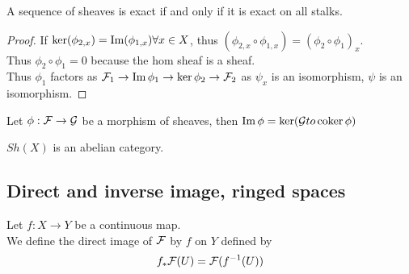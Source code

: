 \documentclass[../main.tex]{subfiles}
\begin{document}
\begin{crly}
A sequence of sheaves is exact if and only if it is exact on all stalks.
\end{crly}
\begin{proof}
If $\ker( \phi_{2,x} ) = \operatorname{Im} ( \phi_{1,x} ) \forall x \in X$, thus $( \phi_{2,x} \circ\phi_{1,x} ) = ( \phi_2\circ\phi_1)_{x} $.\\
Thus $\phi_2\circ\phi_1=0$ because the hom sheaf is a sheaf.\\
Thus $\phi_1$ factors as $\mathcal{F}_1\to \operatorname{Im} \phi_1\to \ker\phi_2\to \mathcal{F}_2$ as $\psi_x$ is an isomorphism, $\psi$ is an isomorphism.
\end{proof}
\begin{crly}
Let $\phi:\mathcal{F}\to \mathcal{G}$ be a morphism of sheaves, then $\operatorname{Im} \phi = \ker ( \mathcal{G} to \operatorname{coker} \phi) $ 
\end{crly}
\begin{crly}
$Sh( X) $ is an abelian category.
\end{crly}
\subsection{Direct and inverse image, ringed spaces}
\begin{defn}
	Let $f:X\to Y$ be a continuous map.\\
We define the direct image of $\mathcal{F}$ by $f$ on $Y$ defined by
\[ 
f_{\ast} \mathcal{F}( U) = \mathcal{F}( f^{-1}( U) ) 
\]

\end{defn}
\end{document}
